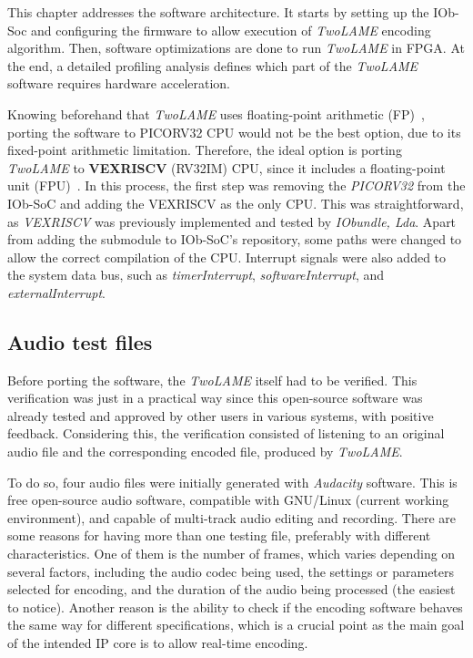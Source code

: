 This chapter addresses the software architecture.
It starts by setting up the IOb-Soc and configuring the firmware to allow execution of \textit{TwoLAME} encoding algorithm. Then, software optimizations are done to run \textit{TwoLAME} in FPGA. 
At the end, a detailed profiling analysis defines which part of the \textit{TwoLAME} software requires hardware acceleration.

Knowing beforehand that \textit{TwoLAME} uses floating-point arithmetic (FP)~\cite{floatingpoint}, porting the software to PICORV32 CPU would not be the best option, due to its fixed-point arithmetic limitation. Therefore, the ideal option is porting \textit{TwoLAME} to \textbf{VEXRISCV} (RV32IM) CPU, since it includes a floating-point unit (FPU)~\cite{fpu}.
In this process, the first step was removing the \textit{PICORV32} from the IOb-SoC and adding the VEXRISCV as the only CPU. This was straightforward, as \textit{VEXRISCV} was previously implemented and tested by \textit{IObundle, Lda}. Apart from adding the submodule to IOb-SoC's repository, some paths were changed to allow the correct compilation of the CPU. Interrupt signals were also added to the system data bus, such as \textit{timerInterrupt}, \textit{softwareInterrupt}, and \textit{externalInterrupt}.

\subsection{Audio test files}

Before porting the software, the \textit{TwoLAME} itself had to be verified. This verification was just in a practical way since this open-source software was already tested and approved by other users in various systems, with positive feedback. Considering this, the verification consisted of listening to an original audio file and the corresponding encoded file, produced by \textit{TwoLAME}.

To do so, four audio files were initially generated with \textit{Audacity} software. This is free open-source audio software, compatible with GNU/Linux (current working environment), and capable of multi-track audio editing and recording.
There are some reasons for having more than one testing file, preferably with different characteristics. One of them is the number of frames, which varies depending on several factors, including the audio codec being used, the settings or parameters selected for encoding, and the duration of the audio being processed (the easiest to notice). Another reason is the ability to check if the encoding software behaves the same way for different specifications, which is a crucial point as the main goal of the intended IP core is to allow real-time encoding.

